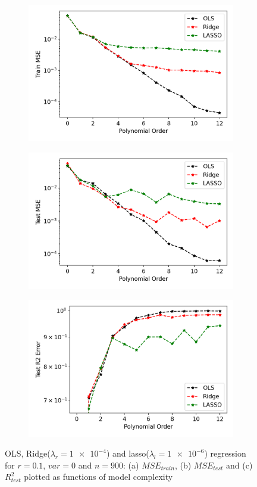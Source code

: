 \begin{figure}[htb]
\centering
\begin{subfigure}{.5\textwidth}
  \centering
  \includegraphics[width=.9\linewidth]{Images/orl2.png}
  \caption{}
  \label{fig:orl1}
\end{subfigure}%
\begin{subfigure}{.5\textwidth}
  \centering
  \includegraphics[width=.9\linewidth]{Images/orl1.png}
  \caption{}
  \label{fig:orl2}
\end{subfigure}
\begin{subfigure}{.5\textwidth}
  \centering
  \includegraphics[width=.9\linewidth]{Images/orl3.png}
  \caption{}
  \label{fig:orl3}
\end{subfigure}
\caption{OLS, Ridge($\lambda_r = \num{1e-4}$) and lasso($\lambda_l = \num{1e-6}$) regression for $r=0.1$, $var=0$ and $n=900$: (a) $MSE_{train}$, (b) $MSE_{test}$ and (c) $R^2_{test}$ plotted as functions of model complexity}
\label{fig:ORL1}
\end{figure}

